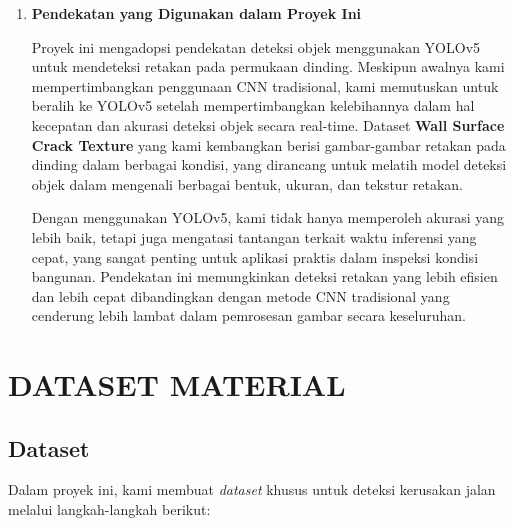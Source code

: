 \documentclass[12pt,a4paper]{article}
\begin{document}
\begin{adjustwidth}{3em}{0pt}
\begin{enumerate}
    \item \textbf{Pendekatan yang Digunakan dalam Proyek Ini}
    
    \hspace{0.5cm} Proyek ini mengadopsi pendekatan deteksi objek menggunakan YOLOv5 untuk mendeteksi retakan pada permukaan dinding. Meskipun awalnya kami mempertimbangkan penggunaan CNN tradisional, kami memutuskan untuk beralih ke YOLOv5 setelah mempertimbangkan kelebihannya dalam hal kecepatan dan akurasi deteksi objek secara real-time. Dataset \textbf{Wall Surface Crack Texture} yang kami kembangkan berisi gambar-gambar retakan pada dinding dalam berbagai kondisi, yang dirancang untuk melatih model deteksi objek dalam mengenali berbagai bentuk, ukuran, dan tekstur retakan.

    \hspace{0.5cm} Dengan menggunakan YOLOv5, kami tidak hanya memperoleh akurasi yang lebih baik, tetapi juga mengatasi tantangan terkait waktu inferensi yang cepat, yang sangat penting untuk aplikasi praktis dalam inspeksi kondisi bangunan. Pendekatan ini memungkinkan deteksi retakan yang lebih efisien dan lebih cepat dibandingkan dengan metode CNN tradisional yang cenderung lebih lambat dalam pemrosesan gambar secara keseluruhan.
\end{enumerate}
\end{adjustwidth}

\section{DATASET MATERIAL}
\subsection{Dataset}
Dalam proyek ini, kami membuat \textit{dataset} khusus untuk deteksi kerusakan jalan melalui langkah-langkah berikut:
\end{document}
